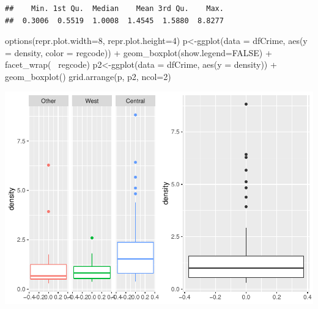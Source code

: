 \documentclass[]{article}
\newenvironment{Shaded}{}{}
\newcommand{\DataTypeTok}[1]{#1}
\newcommand{\DecValTok}[1]{#1}
\newcommand{\KeywordTok}[1]{\textcolor[rgb]{0.00,0.00,1.00}{#1}}
\newcommand{\NormalTok}[1]{#1}
\newcommand{\OperatorTok}[1]{#1}
\newcommand{\OtherTok}[1]{\textcolor[rgb]{1.00,0.25,0.00}{#1}}
\newcommand{\StringTok}[1]{\textcolor[rgb]{0.00,0.50,0.50}{#1}}
\begin{document}
\begin{Shaded}
\end{Shaded}

\begin{verbatim}
##    Min. 1st Qu.  Median    Mean 3rd Qu.    Max. 
##  0.3006  0.5519  1.0008  1.4545  1.5880  8.8277
\end{verbatim}

\begin{Shaded}
\begin{Highlighting}[]
\KeywordTok{options}\NormalTok{(}\DataTypeTok{repr.plot.width=}\DecValTok{8}\NormalTok{, }\DataTypeTok{repr.plot.height=}\DecValTok{4}\NormalTok{)}
\NormalTok{p<-}\KeywordTok{ggplot}\NormalTok{(}\DataTypeTok{data =}\NormalTok{ dfCrime, }\KeywordTok{aes}\NormalTok{(}\DataTypeTok{y =}\NormalTok{ density, }\DataTypeTok{color =}\NormalTok{ regcode)) }\OperatorTok{+}
\StringTok{     }\KeywordTok{geom_boxplot}\NormalTok{(}\DataTypeTok{show.legend=}\OtherTok{FALSE}\NormalTok{) }\OperatorTok{+}\StringTok{ }\KeywordTok{facet_wrap}\NormalTok{(}\OperatorTok{~}\StringTok{ }\NormalTok{regcode)}
\NormalTok{p2<-}\KeywordTok{ggplot}\NormalTok{(}\DataTypeTok{data =}\NormalTok{ dfCrime, }\KeywordTok{aes}\NormalTok{(}\DataTypeTok{y =}\NormalTok{ density)) }\OperatorTok{+}
\StringTok{     }\KeywordTok{geom_boxplot}\NormalTok{()}
\KeywordTok{grid.arrange}\NormalTok{(p, p2, }\DataTypeTok{ncol=}\DecValTok{2}\NormalTok{)}
\end{Highlighting}
\end{Shaded}

\includegraphics{Bagnard_Gaustad_Hartman_Leung_Lab_3_files/figure-latex/unnamed-chunk-78-1.pdf}
\end{document}
